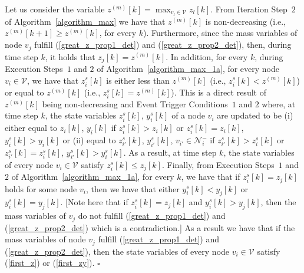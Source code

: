 \documentclass[twocolumn]{autart}    %
\begin{document}
\begin{pf}
Let us consider the variable
$
z^{(m)}[k] = \max_{v_l \in \mathcal{V}} z_l[k] . 
$
From Iteration Step~$2$ of Algorithm~\ref{algorithm_max} we have that $z^{(m)}[k]$ is non-decreasing (i.e., $z^{(m)}[k+1] \geq z^{(m)}[k]$, for every $k$). 
Furthermore, since the mass variables of node $v_j$ fulfill (\ref{great_z_prop1_det}) and (\ref{great_z_prop2_det}), then, during time step $k$, it holds that  
$
z_j[k] = z^{(m)}[k]. 
$
In addition, for every $k$, during Execution Steps~$1$ and $2$ of Algorithm~\ref{algorithm_max_1a}, for every node $v_i \in \mathcal{V}$, we have that $z_i^s[k]$ is either less than $z^{(m)}[k]$ (i.e., $z_i^s[k] < z^{(m)}[k]$) or equal to $z^{(m)}[k]$ (i.e., $z_i^s[k] = z^{(m)}[k]$). 
This is a direct result of $z^{(m)}[k]$ being non-decreasing and Event Trigger Conditions~$1$ and $2$ where, at time step $k$, the state variables $z_i^s[k]$, $y_i^s[k]$ of a node $v_i$ are updated to be (i) either equal to $z_i[k]$, $y_i[k]$ if $z_i^s[k] > z_i[k]$ or $z_i^s[k] = z_i[k]$, $y_i^s[k] > y_i[k]$ or (ii) equal to $z_{i'}^s[k]$, $y_{i'}^s[k]$, $v_{i'} \in \mathcal{N}_i^-$ if $z_{i'}^s[k] > z_{i}^s[k]$ or $z_{i'}^s[k] = z_{i}^s[k]$, $y_{i'}^s[k] > y_{i}^s[k]$.
As a result, at time step $k$, the state variables of every node $v_i \in \mathcal{V}$ satisfy 
$
z_i^s[k] \leq z_j[k] .
$
Finally, from Execution Steps~$1$ and $2$ of Algorithm~\ref{algorithm_max_1a}, for every $k$, we have that if $z_i^s[k] = z_j[k]$ holds for some node $v_i$, then we have that either $y_i^s[k] < y_j[k]$ or $y_i^s[k] = y_j[k]$. 
[Note here that if $z_i^s[k] = z_j[k]$ and $y_i^s[k] > y_j[k]$, then the mass variables of $v_j$ do not fulfill (\ref{great_z_prop1_det}) and (\ref{great_z_prop2_det}) which is a contradiction.]
As a result we have that if the mass variables of node $v_j$ fulfill (\ref{great_z_prop1_det}) and (\ref{great_z_prop2_det}), then the state variables of every node $v_i \in \mathcal{V}$ satisfy (\ref{first_z}) or (\ref{first_zy}).  \hspace*{\fill} $\square$
\end{pf}
\end{document}
